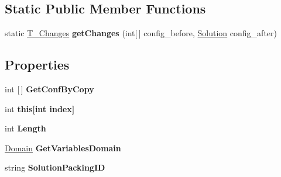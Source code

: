 \subsection*{Static Public Member Functions}
\begin{DoxyCompactItemize}
\item 
\mbox{\label{classPOSL_1_1Data_1_1Solution_a62265e94c29382a7083fcc2c7d8a836f}} 
static \hyperlink{structPOSL_1_1Tools_1_1T__Changes}{T\+\_\+\+Changes} {\bfseries get\+Changes} (int\mbox{[}$\,$\mbox{]} config\+\_\+before, \hyperlink{classPOSL_1_1Data_1_1Solution}{Solution} config\+\_\+after)
\end{DoxyCompactItemize}
\subsection*{Properties}
\begin{DoxyCompactItemize}
\item 
\mbox{\label{classPOSL_1_1Data_1_1Solution_a5dde67410118890f2acb3e5d0d2cab68}} 
int \mbox{[}$\,$\mbox{]} {\bfseries Get\+Conf\+By\+Copy}
\item 
\mbox{\label{classPOSL_1_1Data_1_1Solution_a7988dba5c7bd9ea33b52624474ee7f14}} 
int {\bfseries this\mbox{[}int index\mbox{]}}
\item 
\mbox{\label{classPOSL_1_1Data_1_1Solution_a88f278fd96c34ccda15720e2c6503d42}} 
int {\bfseries Length}
\item 
\mbox{\label{classPOSL_1_1Data_1_1Solution_acfa819580e4b046270604301c1ce47a1}} 
\hyperlink{classPOSL_1_1Domain}{Domain} {\bfseries Get\+Variables\+Domain}
\item 
\mbox{\label{classPOSL_1_1Data_1_1Solution_a870b7aba50a01904d1436f8e4b2f6226}} 
string {\bfseries Solution\+Packing\+ID}
\end{DoxyCompactItemize}


